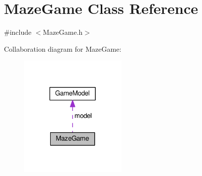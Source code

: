 \hypertarget{classMazeGame}{\section{Maze\-Game Class Reference}
\label{classMazeGame}
}


{\ttfamily \#include $<$Maze\-Game.\-h$>$}



Collaboration diagram for Maze\-Game\-:\nopagebreak
\begin{figure}[H]
\begin{center}
\leavevmode
\includegraphics[width=148pt]{classMazeGame__coll__graph}
\end{center}
\end{figure}
